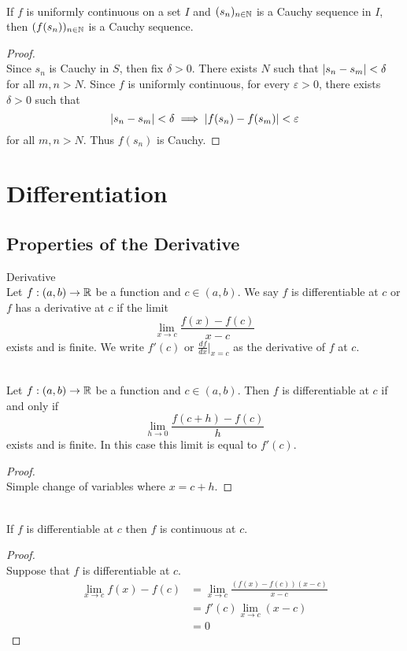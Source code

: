 \documentclass[a4paper]{article}
\begin{document}
\begin{thm}{}{}\\ If $f$ is uniformly continuous on a set $I$ and $(s_n)_{n\in\mathbb{N}}$ is a Cauchy sequence in $I$, then $(f(s_n))_{n\in\mathbb{N}}$ is a Cauchy sequence. 
\begin{proof}\\ Since $s_n$ is Cauchy in $S$, then fix $\delta>0$. There exists $N$ such that $\abs{s_n-s_m}<\delta$ for all $m,n>N$. Since $f$ is uniformly continuous, for every $\varepsilon>0$, there exists $\delta>0$ such that $$\abs{s_n-s_m}<\delta\implies\abs{f(s_n)-f(s_m)}<\varepsilon$$ for all $m,n>N$. Thus $f(s_n)$ is Cauchy. 
\end{proof}
\end{thm}

\pagebreak
\section{Differentiation}
\subsection{Properties of the Derivative}
\begin{defn}{Derivative}{}\\ Let $f:(a,b)\to\mathbb{R}$ be a function and $c\in(a,b)$. We say $f$ is differentiable at $c$ or $f$ has a derivative at $c$ if the limit $$\lim_{x\to c}\frac{f(x)-f(c)}{x-c}$$ exists and is finite. We write $f'(c)$ or $\frac{df}{dx}\vert_{x=c}$ as the derivative of $f$ at $c$. 
\end{defn}

\begin{prp}{}{}\\ Let $f:(a,b)\to\mathbb{R}$ be a function and $c\in(a,b)$. Then $f$ is differentiable at $c$ if and only if $$\lim_{h\to 0}\frac{f(c+h)-f(c)}{h}$$ exists and is finite. In this case this limit is equal to $f'(c)$. 
\begin{proof}\\
Simple change of variables where $x=c+h$. 
\end{proof}
\end{prp}

\begin{prp}{}{}\\ If $f$ is differentiable at $c$ then $f$ is continuous at $c$. 
\begin{proof}\\ Suppose that $f$ is differentiable at $c$. 
\begin{align*}
\lim_{x\to c}f(x)-f(c)&=\lim_{x\to c}\frac{(f(x)-f(c))(x-c)}{x-c}\\
&=f'(c)\lim_{x\to c}(x-c)\\
&=0
\end{align*}
\end{proof}
\end{prp}
\end{document}
